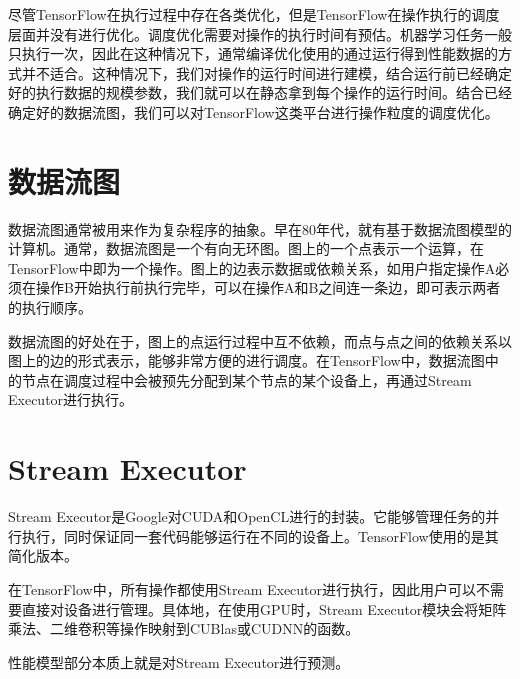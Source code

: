     尽管TensorFlow在执行过程中存在各类优化，但是TensorFlow在操作执行的调度层面并没有进行优化。调度优化需要对操作的执行时间有预估。机器学习任务一般只执行一次，因此在这种情况下，通常编译优化使用的通过运行得到性能数据的方式并不适合。这种情况下，我们对操作的运行时间进行建模，结合运行前已经确定好的执行数据的规模参数，我们就可以在静态拿到每个操作的运行时间。结合已经确定好的数据流图，我们可以对TensorFlow这类平台进行操作粒度的调度优化。

\section{数据流图}
    数据流图通常被用来作为复杂程序的抽象。早在80年代，就有基于数据流图模型的计算机\cite{dataflow_machine}。通常，数据流图是一个有向无环图。图上的一个点表示一个运算，在TensorFlow中即为一个操作。图上的边表示数据或依赖关系，如用户指定操作A必须在操作B开始执行前执行完毕，可以在操作A和B之间连一条边，即可表示两者的执行顺序。
    
    数据流图的好处在于，图上的点运行过程中互不依赖，而点与点之间的依赖关系以图上的边的形式表示，能够非常方便的进行调度。在TensorFlow中，数据流图中的节点在调度过程中会被预先分配到某个节点的某个设备上，再通过Stream Executor进行执行。

\section{Stream Executor}
    Stream Executor是Google对CUDA和OpenCL进行的封装。它能够管理任务的并行执行，同时保证同一套代码能够运行在不同的设备上。TensorFlow使用的是其简化版本。

    在TensorFlow中，所有操作都使用Stream Executor进行执行，因此用户可以不需要直接对设备进行管理。具体地，在使用GPU时，Stream Executor模块会将矩阵乘法、二维卷积等操作映射到CUBlas或CUDNN\cite{cudnn}的函数。
    
    性能模型部分本质上就是对Stream Executor进行预测。
    